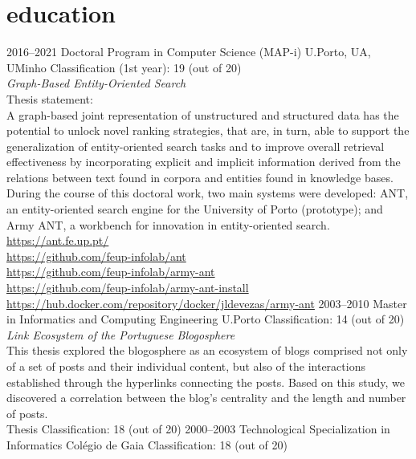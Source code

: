 \documentclass{friggeri-cv}
\begin{document}

\section{education}

\begin{entrylist}
\entry
{2016--2021}
{Doctoral Program {\normalfont in Computer Science (MAP-i)}}
{U.Porto, UA, UMinho}
{Classification (1st year): 19 (out of 20)\\[.5ex]
\emph{Graph-Based Entity-Oriented Search}\\[.5ex]
Thesis statement:\\
A graph-based joint representation of unstructured and structured data has the potential to unlock novel ranking strategies, that are, in turn, able to support the generalization of entity-oriented search tasks and to improve overall retrieval effectiveness by incorporating explicit and implicit information derived from the relations between text found in corpora and entities found in knowledge bases.\\[-.75em]

During the course of this doctoral work, two main systems were developed: ANT, an entity-oriented search engine for the University of Porto (prototype); and Army ANT, a workbench for innovation in entity-oriented search.\\[-.75em]

\url{https://ant.fe.up.pt/}\\
\url{https://github.com/feup-infolab/ant}\\[-.75em]

\url{https://github.com/feup-infolab/army-ant}\\
\url{https://github.com/feup-infolab/army-ant-install}\\
\url{https://hub.docker.com/repository/docker/jldevezas/army-ant}}
\entry
{2003--2010}
{Master {\normalfont in Informatics and Computing Engineering}}
{U.Porto}
{Classification: 14 (out of 20)\\[.5ex]
\emph{Link Ecosystem of the Portuguese Blogosphere}\\[.5ex]
This thesis explored the blogosphere as an ecosystem of blogs comprised not only of a set of posts and their
individual content, but also of the interactions established through the hyperlinks connecting the posts. Based on
this study, we discovered a correlation between the blog's centrality and the length and number of posts.\\[.5ex]
Thesis Classification: 18 (out of 20)}
\entry
{2000--2003}
{Technological Specialization {\normalfont in Informatics}}
{Colégio de Gaia}
{Classification: 18 (out of 20)}
\end{entrylist}
\end{document}
